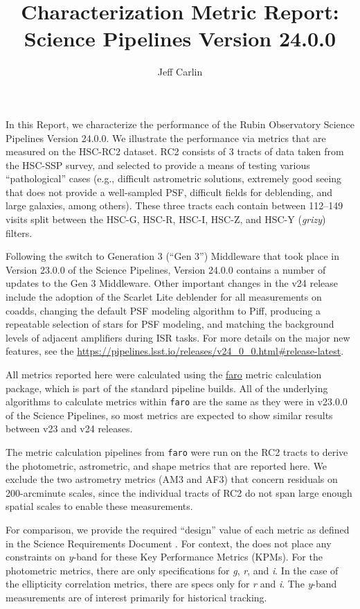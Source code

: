\documentclass[DM,toc]{lsstdoc}
\title{Characterization Metric Report: Science Pipelines Version 24.0.0}
\author{%
Jeff Carlin
}
\date{\vcsDate}
\begin{document}
\maketitle

In this Report, we characterize the performance of the Rubin Observatory Science Pipelines Version 24.0.0. We illustrate the performance via metrics that are measured on the HSC-RC2 dataset. RC2 consists of 3 tracts of data taken from the HSC-SSP survey, and selected to provide a means of testing various ``pathological'' cases (e.g., difficult astrometric solutions, extremely good seeing that does not provide a well-sampled PSF, difficult fields for deblending, and large galaxies, among others). These three tracts each contain between 112--149 visits split between the HSC-G, HSC-R, HSC-I, HSC-Z, and HSC-Y (\emph{grizy}) filters.

Following the switch to Generation 3 (``Gen 3'') Middleware that took place in Version 23.0.0 of the Science Pipelines, Version 24.0.0 contains a number of updates to the Gen 3 Middleware. Other important changes in the v24 release include the adoption of the Scarlet Lite deblender for all measurements on coadds, changing the default PSF modeling algorithm to Piff, producing a repeatable selection of stars for PSF modeling, and matching the background levels of adjacent amplifiers during ISR tasks. For more details on the major new features, see the \href{release notes for v24}{https://pipelines.lsst.io/releases/v24_0_0.html#release-latest}.

All metrics reported here were calculated using the \href{https://github.com/lsst/faro}{faro} metric calculation package, which is part of the standard pipeline builds. All of the underlying algorithms to calculate metrics within \texttt{faro} are the same as they were in v23.0.0 of the Science Pipelines, so most metrics are expected to show similar results between v23 and v24 releases.

The metric calculation pipelines from \texttt{faro} were run on the RC2 tracts to derive the photometric, astrometric, and shape metrics that are reported here. We exclude the two astrometry metrics (AM3 and AF3) that concern residuals on 200-arcminute scales, since the individual tracts of RC2 do not span large enough spatial scales to enable these measurements.

For comparison, we provide the \SRD required ``design'' value of each metric as defined in the Science Requirements Document . For context, the \SRD does not place any constraints on \emph{y}-band for these Key Performance Metrics (KPMs).  For the photometric metrics, there are only specifications for \emph{g}, \emph{r}, and \emph{i}. In the case of the ellipticity correlation metrics, there are specs only for \emph{r} and \emph{i}. The \emph{y}-band measurements are of interest primarily for historical tracking.
\end{document}
